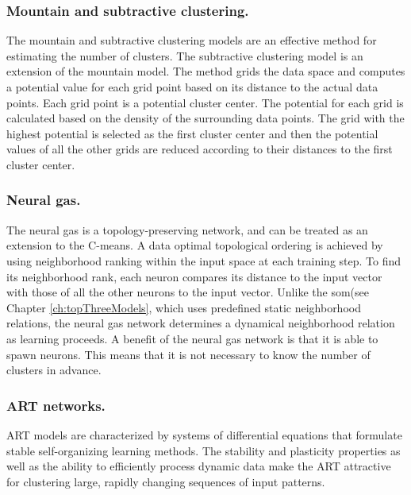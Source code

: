 \documentclass[../main]{subfiles}
\begin{document}
\subsubsection{Mountain and subtractive clustering.}
The mountain and subtractive clustering models are an effective method for estimating the number of clusters\cite{Du2010Clustering:Approach}. 
The subtractive clustering model is an extension of the mountain model\cite{Du2010Clustering:Approach}. 
\newline
The method grids the data space and computes a potential value for each grid point based on its distance to the actual data points. Each grid point is a potential cluster center. 
The potential for each grid is calculated based on the density of the surrounding data points. 
The grid with the highest potential is selected as the first cluster center and then the potential values of all the other grids are reduced according to their distances to the first cluster center\cite{Du2010Clustering:Approach}.

\subsubsection{Neural gas.}
The neural gas is a topology-preserving network, and can be treated as an extension to the C-means\cite{Du2010Clustering:Approach}.
A data optimal topological ordering is achieved by using neighborhood ranking within the input space at each training step\cite{Du2010Clustering:Approach}.
To find its neighborhood rank, each neuron compares its distance to the input vector with those of all the other neurons to the input vector\cite{Du2010Clustering:Approach}. 
Unlike the \acrlong{som}(see Chapter \ref{ch:topThreeModels}, which uses predefined static neighborhood relations, the neural gas network determines a dynamical neighborhood relation as learning proceeds\cite{Du2010Clustering:Approach}.
A benefit of the neural gas network is that it is able to spawn neurons.
This means that it is not necessary to know the number of clusters in advance.

\subsubsection{ART networks.}
ART models are characterized by systems of differential equations that formulate stable self-organizing learning methods\cite{Du2010Clustering:Approach}.
The stability and plasticity properties as well as the ability to efficiently process dynamic data make the ART attractive for clustering large, rapidly changing sequences of input patterns\cite{Du2010Clustering:Approach}.
\newline
\end{document}
